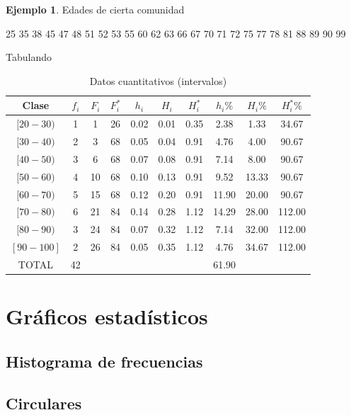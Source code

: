 \documentclass[
  11pt,
]{krantz}
\theoremstyle{definition}
\theoremstyle{definition}
\newtheorem{example}{Ejemplo}[chapter]
\theoremstyle{definition}
\theoremstyle{definition}
\theoremstyle{remark}
\begin{document}
\begin{example}

Edades de cierta comunidad

25
35 38
45 47 48
51 52 53 55
60 62 63 66 67
70 71 72 75 77 78
81 88 89
90 99

Tabulando

\begin{longtable}[t]{cccccccccc}
\caption{\label{tab:cuantitativa}Datos cuantitativos (intervalos)}\\
\toprule
Clase & $f_i$ & $F_i$ & $F_i^*$ & $h_i$ & $H_i$ & $H_i^*$ & $h_i\%$ & $H_i\%$ & $H_i^*\%$\\
\midrule
$[20-30)$ & 1 & 1 & 26 & 0.02 & 0.01 & 0.35 & 2.38 & 1.33 & 34.67\\
$[30-40)$ & 2 & 3 & 68 & 0.05 & 0.04 & 0.91 & 4.76 & 4.00 & 90.67\\
$[40-50)$ & 3 & 6 & 68 & 0.07 & 0.08 & 0.91 & 7.14 & 8.00 & 90.67\\
$[50-60)$ & 4 & 10 & 68 & 0.10 & 0.13 & 0.91 & 9.52 & 13.33 & 90.67\\
$[60-70)$ & 5 & 15 & 68 & 0.12 & 0.20 & 0.91 & 11.90 & 20.00 & 90.67\\
$[70-80)$ & 6 & 21 & 84 & 0.14 & 0.28 & 1.12 & 14.29 & 28.00 & 112.00\\
$[80-90)$ & 3 & 24 & 84 & 0.07 & 0.32 & 1.12 & 7.14 & 32.00 & 112.00\\
$[90-100]$ & 2 & 26 & 84 & 0.05 & 0.35 & 1.12 & 4.76 & 34.67 & 112.00\\
TOTAL & 42 &  &  &  &  &  & 61.90 &  & \\
\bottomrule
\end{longtable}

\end{example}

\hypertarget{gruxe1ficos-estaduxedsticos}{%
\chapter{Gráficos estadísticos}\label{gruxe1ficos-estaduxedsticos}}

\hypertarget{histograma-de-frecuencias}{%
\section{Histograma de frecuencias}\label{histograma-de-frecuencias}}

\hypertarget{circulares}{%
\section{Circulares}\label{circulares}}
\end{document}
